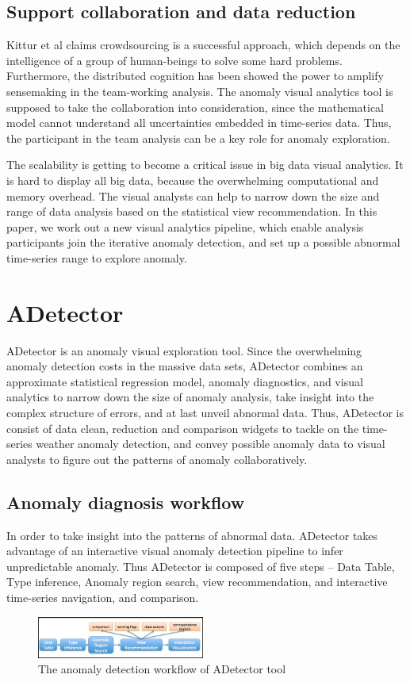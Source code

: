 \documentclass{vgtc}                          %
\begin{document}
\subsection{Support collaboration and data reduction}

	Kittur et al\cite{kittur2008crowdsourcing} claims crowdsourcing is a successful approach, which depends on the intelligence of a group of human-beings to solve some hard problems. Furthermore, the distributed cognition\cite{liu2008distributed} has been showed the power to amplify sensemaking in the team-working analysis. The anomaly visual analytics tool is supposed to take the collaboration into consideration, since the mathematical model cannot understand all uncertainties embedded in time-series data. Thus, the participant in the team analysis can be a key role for anomaly exploration.
	 
	The scalability is getting to become a critical issue in big data visual analytics. It is hard to display all big data, because the overwhelming computational and memory overhead. The visual analysts can help to narrow down the size and range of data analysis based on the statistical view recommendation. In this paper, we work out a new visual analytics pipeline, which enable analysis participants join the iterative anomaly detection, and set up a possible abnormal time-series range to explore anomaly.


\section{ADetector}

ADetector is an anomaly visual exploration tool. Since the overwhelming anomaly detection costs in the massive data sets, ADetector combines an approximate statistical regression model, anomaly diagnostics, and visual analytics to narrow down the size of anomaly analysis, take insight into the complex structure of errors, and at last unveil abnormal data. Thus, ADetector is consist of data clean, reduction and comparison widgets to tackle on the time-series weather anomaly detection, and convey possible anomaly data to visual analysts to figure out the patterns of anomaly collaboratively.

\subsection{Anomaly diagnosis workflow}

In order to take insight into the patterns of abnormal data. ADetector takes advantage of an interactive visual anomaly detection pipeline to infer unpredictable anomaly. Thus ADetector is composed of five steps -- Data Table, Type inference, Anomaly region search, view recommendation, and interactive time-series navigation, and comparison.
 \begin{figure}[htb]
	\centering
  \includegraphics[width=0.49\textwidth]{workflow.png}
  \caption{The anomaly detection workflow of ADetector tool}
\end{figure}
\end{document}
